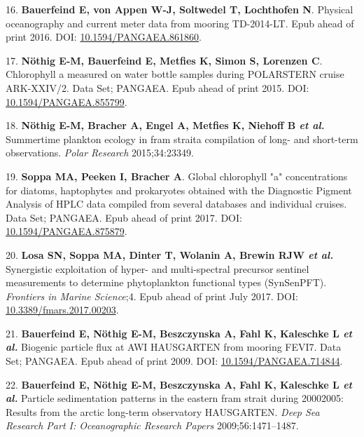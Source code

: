 \documentclass[]{article}
\begin{document}
\leavevmode\hypertarget{ref-bauerfeind2016poac}{}%
16. \textbf{Bauerfeind E, von Appen W-J, Soltwedel T, Lochthofen N}.
Physical oceanography and current meter data from mooring TD-2014-LT.
Epub ahead of print 2016. DOI:
\href{https://doi.org/10.1594/PANGAEA.861860}{10.1594/PANGAEA.861860}.

\leavevmode\hypertarget{ref-nthig2015camo}{}%
17. \textbf{Nöthig E-M, Bauerfeind E, Metfies K, Simon S, Lorenzen C}.
Chlorophyll a measured on water bottle samples during POLARSTERN cruise
ARK-XXIV/2. Data Set; PANGAEA. Epub ahead of print 2015. DOI:
\href{https://doi.org/10.1594/PANGAEA.855799}{10.1594/PANGAEA.855799}.

\leavevmode\hypertarget{ref-N_thig_2015}{}%
18. \textbf{Nöthig E-M, Bracher A, Engel A, Metfies K, Niehoff B
\emph{et al.}} Summertime plankton ecology in fram straita compilation
of long- and short-term observations. \emph{Polar Research}
2015;34:23349.

\leavevmode\hypertarget{ref-soppa2017gcac}{}%
19. \textbf{Soppa MA, Peeken I, Bracher A}. Global chlorophyll "a"
concentrations for diatoms, haptophytes and prokaryotes obtained with
the Diagnostic Pigment Analysis of HPLC data compiled from several
databases and individual cruises. Data Set; PANGAEA. Epub ahead of print
2017. DOI:
\href{https://doi.org/10.1594/PANGAEA.875879}{10.1594/PANGAEA.875879}.

\leavevmode\hypertarget{ref-Losa_2017}{}%
20. \textbf{Losa SN, Soppa MA, Dinter T, Wolanin A, Brewin RJW \emph{et
al.}} Synergistic exploitation of hyper- and multi-spectral precursor
sentinel measurements to determine phytoplankton functional types
(SynSenPFT). \emph{Frontiers in Marine Science};4. Epub ahead of print
July 2017. DOI:
\href{https://doi.org/10.3389/fmars.2017.00203}{10.3389/fmars.2017.00203}.

\leavevmode\hypertarget{ref-bauerfeind2009bpfa}{}%
21. \textbf{Bauerfeind E, Nöthig E-M, Beszczynska A, Fahl K, Kaleschke L
\emph{et al.}} Biogenic particle flux at AWI HAUSGARTEN from mooring
FEVI7. Data Set; PANGAEA. Epub ahead of print 2009. DOI:
\href{https://doi.org/10.1594/PANGAEA.714844}{10.1594/PANGAEA.714844}.

\leavevmode\hypertarget{ref-Bauerfeind_2009}{}%
22. \textbf{Bauerfeind E, Nöthig E-M, Beszczynska A, Fahl K, Kaleschke L
\emph{et al.}} Particle sedimentation patterns in the eastern fram
strait during 20002005: Results from the arctic long-term observatory
HAUSGARTEN. \emph{Deep Sea Research Part I: Oceanographic Research
Papers} 2009;56:1471--1487.
\end{document}
